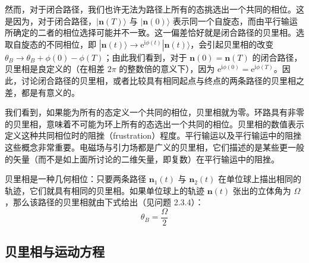 
然而，对于闭合路径，我们也许无法为路径上所有的态挑选出一个共同的相位。这是因为，对于闭合路径，$|\pmb{n}(T)\rangle$ 与 $|\pmb{n}(0)\rangle$ 表示同一个自旋态，而由平行输运所确定的二者的相位选择可能并不一致。这一偏差恰好就是闭合路径的贝里相。选取自旋态的不同相位，即 $|\pmb{n}(t)\rangle \to \mathrm{e}^{\mathrm{i}\phi(t)}|\pmb{n}(t)\rangle$，会引起贝里相的改变 $\theta_B \to \theta_B + \phi(0) - \phi(T)$；由此我们看到，对于 $\pmb{n}(0) = \pmb{n}(T)$ 的闭合路径，贝里相是良定义的（在相差 $2\pi$ 的整数倍的意义下），因为 $\mathrm{e}^{\mathrm{i}\phi(0)} = \mathrm{e}^{\mathrm{i}\phi(T)}$。因此，讨论闭合路径的贝里相，或者比较具有相同起点与终点的两条路径的贝里相之差，都是有意义的。

我们看到，如果能为所有的态定义一个共同的相位，贝里相就为零。环路具有非零的贝里相，意味着不可能为环上所有的态选出一个共同的相位。贝里相的数值表示定义这种共同相位时的阻挫（frustration）程度。平行输运以及平行输运中的阻挫这些概念非常重要。电磁场与引力场都是广义的贝里相，它们描述的是某些更一般的矢量（而不是如上面所讨论的二维矢量，即复数）在平行输运中的阻挫。

贝里相是一种几何相位：只要两条路径 $\pmb{n}_1(t)$ 与 $\pmb{n}_2(t)$ 在单位球上描出相同的轨迹，它们就具有相同的贝里相。如果单位球上的轨迹 $\pmb{n}(t)$ 张出的立体角为 $\Omega$，那么该路径的贝里相就由下式给出（见问题 2.3.4）：
\begin{equation*}
\theta_B = \frac{\Omega}{2}\tag{2.3.5}
\end{equation*}

\subsection{贝里相与运动方程}

